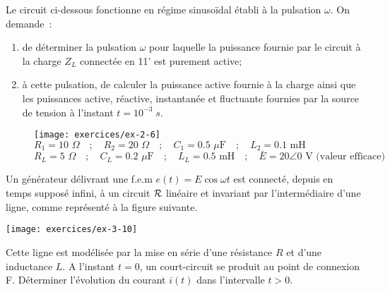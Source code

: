 \begin{exercise}{}\label{ex:RSE-6}
Le circuit ci-dessous fonctionne en régime
sinusoïdal établi à la pulsation $\omega$. On demande~:
\begin{enumerate}
	\item de déterminer la pulsation $\omega$ pour laquelle la puissance fournie par
	le circuit à la charge $Z_L$ connectée en 11' est purement active;
	\item à cette pulsation, de calculer la puissance active fournie à la
	charge ainsi que les puissances active, réactive, instantanée et
	fluctuante fournies par la source de tension à l'instant $t= 10^{-3}\;s$.
\end{enumerate}
\begin{figure}[h]
	\begin{center}
		\texttt{[image: exercices/ex-2-6]}\\
		$R_1=10\mbox{~}\Omega \quad ; \quad R_2=20  \mbox{~}\Omega  \quad
		; \quad C_1=0.5  \mbox{~}\mu\mbox{F} 
		\quad ; \quad L_2=0.1  \mbox{~mH}$\\
		$R_L=5  \mbox{~}\Omega \quad ; \quad C_L=0.2 \mbox{~}\mu\mbox{F}
		\quad ; \quad L_L= 0.5 \mbox{~mH} \quad ; \quad {\bar E} = 20\angle 0 \mbox{~V (valeur efficace)}$\\
		\caption{}\label{ex2-6}
	\end{center}
\end{figure}

\end{exercise}

\begin{exercise}{}
	\label{ex:2-10}
	Un générateur délivrant une f.e.m $e(t)=E\cos \omega t$ est
	connecté, depuis en temps supposé infini, à un circuit $\cal R$
	linéaire et invariant par l'intermédiaire d'une ligne, comme
	représenté à la figure suivante. 
	\begin{center}
		\texttt{[image: exercices/ex-3-10]}
	\end{center}
	Cette ligne est modélisée par la
	mise en série d'une résistance $R$ et d'une inductance $L$. A
	l'instant $t=0$, un court-circuit se produit au point de connexion
	F. Déterminer l'évolution du courant $i(t)$ dans l'intervalle $t>0$.
	
	
\end{exercise}

